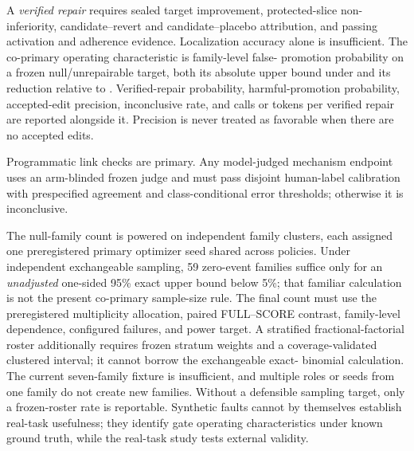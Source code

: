 A \emph{verified repair} requires sealed target improvement, protected-slice
non-inferiority, candidate--revert and candidate--placebo attribution, and
passing activation and adherence evidence.  Localization accuracy alone is
insufficient.  The co-primary operating characteristic is family-level false-
promotion probability on a frozen null/unrepairable target, both its absolute
upper bound under \fullarm{} and its reduction relative to \scorearm{}.
Verified-repair probability, harmful-promotion probability, accepted-edit
precision, inconclusive rate, and calls or tokens per verified repair are
reported alongside it.  Precision is never treated as favorable when there are
no accepted edits.

Programmatic link checks are primary.  Any model-judged mechanism endpoint uses
an arm-blinded frozen judge and must pass disjoint human-label calibration with
prespecified agreement and class-conditional error thresholds; otherwise it is
inconclusive.

The null-family count is powered on independent family clusters, each assigned
one preregistered primary optimizer seed shared across policies.  Under
independent exchangeable sampling, 59 zero-event families suffice only for an
\emph{unadjusted} one-sided 95\% exact upper bound below 5\%; that familiar
calculation is not the present co-primary sample-size rule.  The final count
must use the preregistered multiplicity allocation, paired FULL--SCORE contrast,
family-level dependence, configured failures, and power target.  A stratified
fractional-factorial roster additionally requires frozen stratum weights and a
coverage-validated clustered interval; it cannot borrow the exchangeable exact-
binomial calculation.  The current seven-family fixture is insufficient, and
multiple roles or seeds from one family do not create new families.  Without a
defensible sampling target, only a frozen-roster rate is reportable.
Synthetic faults cannot by themselves establish real-task usefulness; they
identify gate operating characteristics under known ground truth, while the
real-task study tests external validity.
